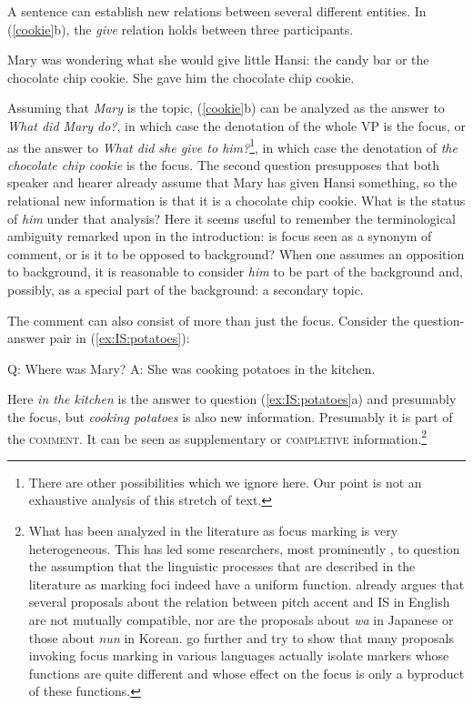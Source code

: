 \documentclass[output=paper,hidelinks]{langscibook}
\begin{document}
A sentence can establish new relations between several different entities. In (\ref{cookie}b), the \textit{give} relation holds between three participants. 

\ea \label{cookie}
\ea Mary was wondering what she would give little Hansi: the candy bar or the chocolate chip cookie.
\ex She gave him the chocolate chip cookie.  
\z\z

Assuming that \emph{Mary} is the topic, (\ref{cookie}b) can be analyzed as the answer to \textit{What did Mary do?}, in which case the denotation of the whole VP is the focus, or as the answer to \textit{What did she give to him?}\footnote{There are other possibilities which we ignore here. Our point is not an exhaustive analysis of this stretch of text.}, in which case the denotation of \textit{the chocolate chip cookie} is the focus. The second question presupposes that both speaker and hearer already assume that Mary has given Hansi something, so the relational new information is that it is a chocolate chip cookie. What is the status of \textit{him} under that analysis? Here it seems useful to remember the terminological ambiguity remarked upon in the introduction: is focus seen as a synonym of comment, or is it to be opposed to background? When one assumes an opposition to background, it is reasonable to consider \textit{him} to be part of the background and, possibly, as a special part of the background: a secondary topic. 

The comment can also consist of more than just the focus. Consider the ques\-tion-answer pair in (\ref{ex:IS:potatoes}):

\ea\label{ex:IS:potatoes}
\ea Q: Where was Mary?
\ex A: She was cooking potatoes in the kitchen.
\z\z

Here \textit{in the kitchen} is the answer to question (\ref{ex:IS:potatoes}a) and presumably the focus, but \textit{cooking potatoes} is also new information. Presumably it is part of the \textsc{comment}. It can be seen as supplementary or \textsc{completive} information.\footnote{What has been analyzed in the literature as focus marking is very heterogeneous. This has led some researchers, most prominently \citet{MaticWedgwood2013}, to question the assumption that the linguistic processes that are described in the literature as marking foci indeed have a uniform function. \citet{Hedberg2006} already argues that several proposals about the relation between pitch accent and IS in English are not mutually compatible,  nor are the proposals about \textit{wa} in Japanese or those about \textit{nun} in Korean. \citet{MaticWedgwood2013} go further and try to show that many proposals invoking focus marking in various languages actually isolate markers whose functions are quite different and whose effect on the focus is only a byproduct of these functions.}
\end{document}
